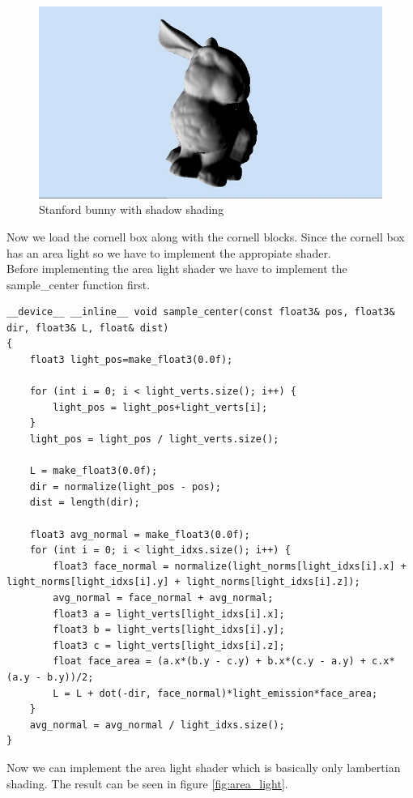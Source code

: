 \begin{figure}[H]
	\centering
	\includegraphics[scale=\imagescale]{images/project/4}
	\caption{Stanford bunny with shadow shading}
	\label{fig:shadow_shading}
\end{figure}
Now we load the cornell box along with the cornell blocks. Since the cornell box has an area light so we have to implement the appropiate shader.\\
Before implementing the area light shader we have to implement the sample\_center function first.
\begin{lstlisting}
__device__ __inline__ void sample_center(const float3& pos, float3& dir, float3& L, float& dist)
{
	float3 light_pos=make_float3(0.0f);
	
	for (int i = 0; i < light_verts.size(); i++) {
		light_pos = light_pos+light_verts[i];
	}
	light_pos = light_pos / light_verts.size();
	
	L = make_float3(0.0f);
	dir = normalize(light_pos - pos);
	dist = length(dir);
	
	float3 avg_normal = make_float3(0.0f);
	for (int i = 0; i < light_idxs.size(); i++) {
		float3 face_normal = normalize(light_norms[light_idxs[i].x] + light_norms[light_idxs[i].y] + light_norms[light_idxs[i].z]);
		avg_normal = face_normal + avg_normal;
		float3 a = light_verts[light_idxs[i].x];
		float3 b = light_verts[light_idxs[i].y];
		float3 c = light_verts[light_idxs[i].z];
		float face_area = (a.x*(b.y - c.y) + b.x*(c.y - a.y) + c.x*(a.y - b.y))/2;
		L = L + dot(-dir, face_normal)*light_emission*face_area;
	}
	avg_normal = avg_normal / light_idxs.size();
}
\end{lstlisting}
Now we can implement the area light shader which is basically only lambertian shading. The result can be seen in figure \ref{fig:area_light}.
